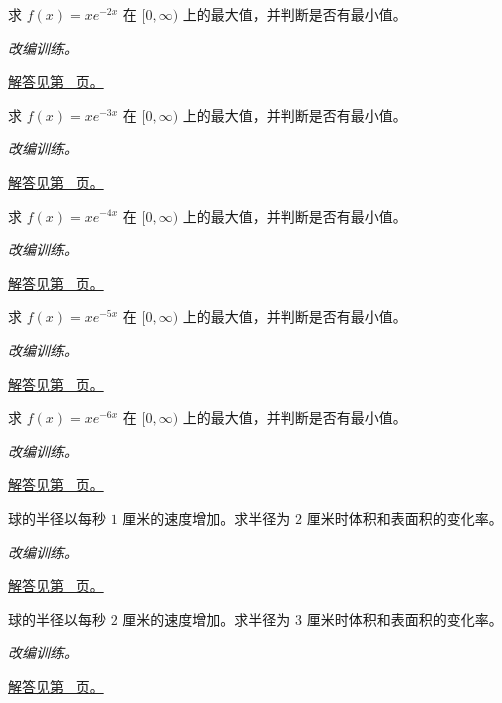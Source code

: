 \documentclass[UTF8,12pt,a4paper,fontset=fandol]{ctexart}
\begin{document}
\begin{example}[指数衰减与内点最大值]\label{ex:c11q15}
求 $f(x)=xe^{-2x}$ 在 $[0,\infty)$ 上的最大值，并判断是否有最小值。
\par\textit{改编训练。}\par\hyperref[ans:c11q15]{解答见第~\pageref{ans:c11q15} 页。}
\end{example}
\begin{example}[指数衰减与内点最大值]\label{ex:c11q16}
求 $f(x)=xe^{-3x}$ 在 $[0,\infty)$ 上的最大值，并判断是否有最小值。
\par\textit{改编训练。}\par\hyperref[ans:c11q16]{解答见第~\pageref{ans:c11q16} 页。}
\end{example}
\begin{example}[指数衰减与内点最大值]\label{ex:c11q17}
求 $f(x)=xe^{-4x}$ 在 $[0,\infty)$ 上的最大值，并判断是否有最小值。
\par\textit{改编训练。}\par\hyperref[ans:c11q17]{解答见第~\pageref{ans:c11q17} 页。}
\end{example}
\begin{example}[指数衰减与内点最大值]\label{ex:c11q18}
求 $f(x)=xe^{-5x}$ 在 $[0,\infty)$ 上的最大值，并判断是否有最小值。
\par\textit{改编训练。}\par\hyperref[ans:c11q18]{解答见第~\pageref{ans:c11q18} 页。}
\end{example}
\begin{example}[指数衰减与内点最大值]\label{ex:c11q19}
求 $f(x)=xe^{-6x}$ 在 $[0,\infty)$ 上的最大值，并判断是否有最小值。
\par\textit{改编训练。}\par\hyperref[ans:c11q19]{解答见第~\pageref{ans:c11q19} 页。}
\end{example}
\begin{example}[相关变化率中的链式法则]\label{ex:c11q20}
球的半径以每秒 $1$ 厘米的速度增加。求半径为 $2$ 厘米时体积和表面积的变化率。
\par\textit{改编训练。}\par\hyperref[ans:c11q20]{解答见第~\pageref{ans:c11q20} 页。}
\end{example}
\begin{example}[相关变化率中的链式法则]\label{ex:c11q21}
球的半径以每秒 $2$ 厘米的速度增加。求半径为 $3$ 厘米时体积和表面积的变化率。
\par\textit{改编训练。}\par\hyperref[ans:c11q21]{解答见第~\pageref{ans:c11q21} 页。}
\end{example}
\end{document}
